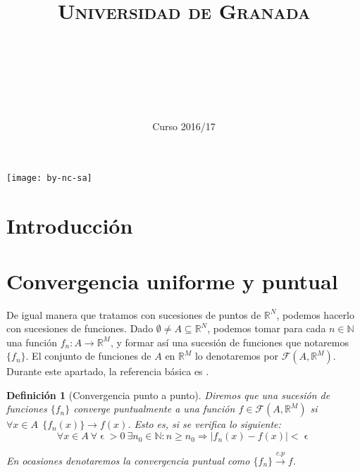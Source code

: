 \documentclass[11pt, a4paper]{article}
\title{
  \normalfont \normalsize 
  \textsc{Universidad de Granada} \\ [25pt]    %
  \horrule{0.5pt} \\[0.4cm] %
  \huge \subject\\ %
  \horrule{2pt} \\[0.5cm] %
}
\author{\Large{\docauthor}}
\date{\vspace{-1.5em} \normalsize Curso 2016/17}
\let\epsilon\upvarepsilon
\newcommand{\R}{\mathbb{R}}
\newcommand{\fn}{\{f_n\}}
\theoremstyle{theorem-style}
\theoremstyle{definition-style}
\newtheorem{ndef}{Definición}[section]
\theoremstyle{remark-style}
\theoremstyle{example-style}
\begin{document}
\maketitle  %
\vfill
\begin{center}
  \texttt{[image: by-nc-sa]}  %
\end{center}
\newpage
\tableofcontents    %
\newpage



\section*{Introducción}


\newpage


\section{Convergencia uniforme y puntual}
De igual manera que tratamos con sucesiones de puntos de $\R^N$, podemos hacerlo con sucesiones de funciones. Dado $\emptyset \ne A \subseteq \R^N$, podemos tomar para cada $n \in \mathbb{N}$ una función $f_n : A \to \R^M$, y formar así una sucesión de funciones que notaremos $\{f_n\}$. El conjunto de funciones de $A$ en $\mathbb{R}^M$ lo denotaremos por $\mathcal{F}(A,\mathbb{R}^M)$. Durante este apartado, la referencia básica es \cite[Capítulo 5]{marsden}.

\begin{ndef}[Convergencia punto a punto] Diremos que una sucesión de funciones $\fn$ converge puntualmente a una función $f\in \mathcal{F}(A,\mathbb{R}^M)$ si $\forall x \in A \ \ \{f_n(x)\} \rightarrow f(x)$. Esto es, si se verifica lo siguiente:
  \[
    \forall x\in A\ \forall \epsilon > 0\ \exists n_0 \in \mathbb{N}: n \ge n_0 \Rightarrow |f_n(x)-f(x)| < \epsilon 
  \]
  
  En ocasiones denotaremos la convergencia puntual como $\fn \xrightarrow {c.p} f$. 
\end{ndef}
\end{document}
